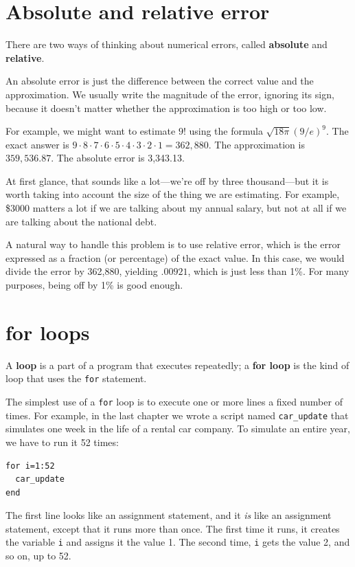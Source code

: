 \documentclass{book}
\begin{document}
\section{Absolute and relative error}

There are two ways of thinking about numerical errors, called {\bf
absolute} and {\bf relative}.

An absolute error is just the difference between the correct value and
the approximation. We usually write the magnitude of the error,
ignoring its sign, because it doesn't matter whether the approximation
is too high or too low.

For example, we might want to estimate $9!$ using the formula $\sqrt
{18 \pi} ( 9 / e)^9$. The exact answer is $9 \cdot 8 \cdot 7 \cdot 6
\cdot 5 \cdot 4 \cdot 3 \cdot 2 \cdot 1 = 362,880$. The approximation
is $359,536.87$. The absolute error is 3,343.13.

At first glance, that sounds like a lot---we're off by three
thousand---but it is worth taking into account the size of the
thing we are estimating. For example, \$3000 matters a lot
if we are talking about my annual salary, but not at all if we
are talking about the national debt.

A natural way to handle this problem is to use relative
error, which is the error expressed as a fraction (or percentage)
of the exact value. In this case, we would divide the error
by 362,880, yielding $.00921$, which is just less than 1\%.
For many purposes, being off by 1\% is good enough.


\section{for loops}

A {\bf loop} is a part of a program that executes repeatedly;
a {\bf for loop} is the kind of loop that uses the {\tt for}
statement.

The simplest use of a {\tt for} loop is to execute one or more
lines a fixed number of times. 
For example, in the last chapter
we wrote a script named {\tt car\_update} that simulates one
week in the life of a rental car company. To simulate an entire
year, we have to run it 52 times:

\begin{verbatim}
for i=1:52
  car_update
end
\end{verbatim}

The first line looks like an assignment statement, and it {\em is}
like an assignment statement, except that it runs more than once. The
first time it runs, it creates the variable {\tt i} and assigns it the
value 1. The second time, {\tt i} gets the value 2, and so on, up to
52.
\end{document}
